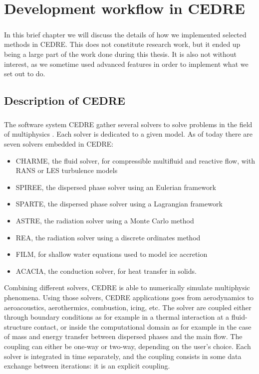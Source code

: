 \chapter{Development workflow in CEDRE}

  \paragraph{}
  In this brief chapter we will discuss the details of how we implemented selected methods in CEDRE.
  This does not constitute research work, but it ended up being a large part of the work done during this thesis.
  It is also not without interest, as we sometime used advanced features in order to implement what we set out to do.


  \section{Description of CEDRE}

    \paragraph{}
    The software system CEDRE gather several solvers to solve problems in the field of multiphysics \cite{ReflochCourbetMurroneEtAl2011}.
    Each solver is dedicated to a given model.
    As of today there are seven solvers embedded in CEDRE:
    \begin{itemize}
      \item CHARME, the fluid solver, for compressible multifluid and reactive flow, with RANS or LES turbulence models
      \item SPIREE, the dispersed phase solver using an Eulerian framework
      \item SPARTE, the dispersed phase solver using a Lagrangian framework
      \item ASTRE, the radiation solver using a Monte Carlo method
      \item REA, the radiation solver using a discrete ordinates method
      \item FILM, for shallow water equations used to model ice accretion
      \item ACACIA, the conduction solver, for heat transfer in solids.
    \end{itemize}
    Combining different solvers, CEDRE is able to numerically simulate multiphysic phenomena.
    Using those solvers, CEDRE applications goes from aerodynamics to aeroacoustics, aerothermics, combustion, icing, etc.
    The solver are coupled either through boundary conditions as for example in a thermal interaction at a fluid-structure contact, or inside the computational domain as for example in the case of mass and energy transfer between dispersed phases and the main flow.
    The coupling can either be one-way or two-way, depending on the user's choice.
    Each solver is integrated in time separately, and the coupling consists in some data exchange between iterations: it is an explicit coupling.

